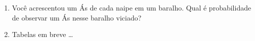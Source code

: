 \documentclass[a4paper]{article}
\begin{document}
\begin{enumerate}
\item Você acrescentou um Ás de cada naipe em um baralho. Qual é
  probabilidade de observar um Ás nesse baralho viciado?

\item Tabelas em breve \ldots





\end{enumerate}
\end{document}
